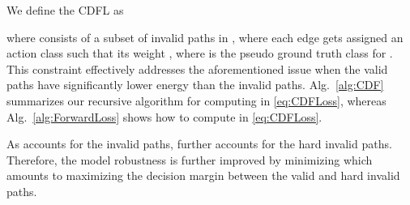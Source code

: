 \documentclass[10pt,twocolumn,letterpaper]{article}
\begin{document}
We define the CDFL as

where  consists of a subset of invalid paths in , where each edge  gets assigned an action class  such that its weight , where  is the pseudo ground truth class for . This constraint effectively addresses the aforementioned issue when the valid paths have significantly lower energy than the invalid paths. 
Alg.~\ref{alg:CDF} summarizes our recursive algorithm for computing  in \eqref{eq:CDFLoss}, whereas Alg.~\ref{alg:ForwardLoss} shows how to compute  in \eqref{eq:CDFLoss}. 

As  accounts for the invalid paths,   further accounts for the hard invalid paths. Therefore, the model robustness is further improved by minimizing  which amounts to maximizing the decision margin between the valid and hard invalid paths.
\end{document}
